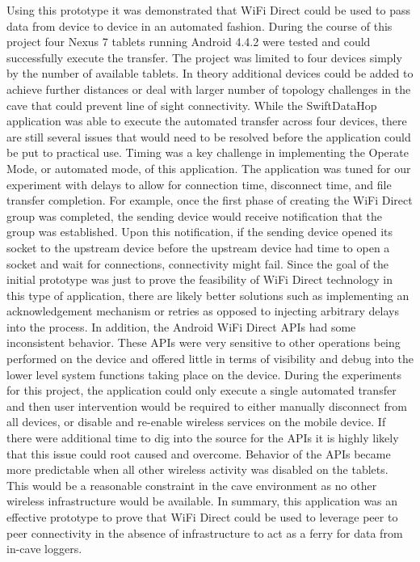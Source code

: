 \documentclass[10pt,twocolumn]{article}
\begin{document}
Using this prototype it was demonstrated that WiFi Direct could be used to pass data from device to device in an automated fashion. 
During the course of this project four Nexus 7 tablets running Android 4.4.2 were tested and could successfully execute the transfer.
The project was limited to four devices simply by the number of available tablets.
In theory additional devices could be added to achieve further distances or deal with larger number of topology challenges in the cave that could prevent line of sight connectivity. 
While the SwiftDataHop application was able to execute the automated transfer across four devices, there are still several issues that would need to be resolved before the application could be put to practical use.
Timing was a key challenge in implementing the Operate Mode, or automated mode, of this application.
The application was tuned for our experiment with delays to allow for connection time, disconnect time, and file transfer completion.
For example, once the first phase of creating the WiFi Direct group was completed, the sending device would receive notification that the group was established.  
Upon this notification, if the sending device opened its socket to the upstream device before the upstream device had time to open a socket and wait for connections, connectivity might fail.
Since the goal of the initial prototype was just to prove the feasibility of WiFi Direct technology in this type of application, there are likely better solutions such as implementing an acknowledgement mechanism or retries as opposed to injecting arbitrary delays into the process. 
In addition, the Android WiFi Direct APIs had some inconsistent behavior.
These APIs were very sensitive to other operations being performed on the device and offered little in terms of visibility and debug into the lower level system functions taking place on the device.
During the experiments for this project, the application could only execute a single automated transfer and then user intervention would be required to either manually disconnect from all devices, or disable and re-enable wireless services on the mobile device.
If there were additional time to dig into the source for the APIs it is highly likely that this issue could root caused and overcome.
Behavior of the APIs became more predictable when all other wireless activity was disabled on the tablets.
This would be a reasonable constraint in the cave environment as no other wireless infrastructure would be available.
In summary, this application was an effective prototype to prove that WiFi Direct could be used to leverage peer to peer connectivity in the absence of infrastructure to act as a ferry for data from in-cave loggers.
\end{document}
